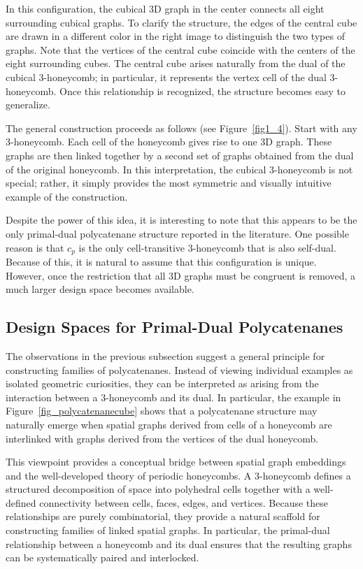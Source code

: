 \documentclass[times,twocolumn,final]{elsarticle}
\begin{document}
In this configuration, the cubical 3D graph in the center connects all eight surrounding cubical graphs. To clarify the structure, the edges of the central cube are drawn in a different color in the right image to distinguish the two types of graphs. Note that the vertices of the central cube coincide with the centers of the eight surrounding cubes. The central cube arises naturally from the dual of the cubical 3-honeycomb; in particular, it represents the vertex cell of the dual 3-honeycomb. Once this relationship is recognized, the structure becomes easy to generalize.

The general construction proceeds as follows (see Figure~\ref{fig1_4}). Start with any 3-honeycomb. Each cell of the honeycomb gives rise to one 3D graph. These graphs are then linked together by a second set of graphs obtained from the dual of the original honeycomb. In this interpretation, the cubical 3-honeycomb is not special; rather, it simply provides the most symmetric and visually intuitive example of the construction.

Despite the power of this idea, it is interesting to note that this appears to be the only primal-dual polycatenane structure reported in the literature. One possible reason is that $c_p$ is the only cell-transitive 3-honeycomb that is also self-dual. Because of this, it is natural to assume that this configuration is unique. However, once the restriction that all 3D graphs must be congruent is removed, a much larger design space becomes available.

\subsection{Design Spaces for Primal-Dual Polycatenanes}

The observations in the previous subsection suggest a general
principle for constructing families of polycatenanes. Instead of
viewing individual examples as isolated geometric curiosities,
they can be interpreted as arising from the interaction between a 3-honeycomb and its dual. In particular, the example in Figure~\ref{fig_polycatenanecube} shows that a polycatenane structure may naturally emerge when spatial graphs derived from cells of a honeycomb are interlinked with graphs derived from the vertices of the dual honeycomb.

This viewpoint provides a conceptual bridge between spatial
graph embeddings and the well-developed theory of periodic
honeycombs. A 3-honeycomb defines a structured decomposition
of space into polyhedral cells together with a well-defined
connectivity between cells, faces, edges, and vertices. Because
these relationships are purely combinatorial, they provide a
natural scaffold for constructing families of linked spatial
graphs. In particular, the primal-dual relationship between a
honeycomb and its dual ensures that the resulting graphs can be
systematically paired and interlocked.
\end{document}
